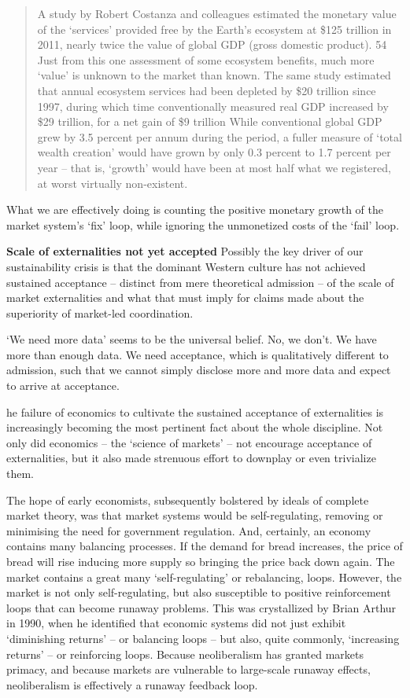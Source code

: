 \documentclass[
]{book}
\begin{document}
\begin{quote}
A study by Robert Costanza and
colleagues estimated the monetary value of the `services' provided free by the Earth's ecosystem at
\$125 trillion in 2011, nearly twice the value of global GDP (gross domestic product). 54 Just from this
one assessment of some ecosystem benefits, much more `value' is unknown to the market than
known.
The same study estimated that annual ecosystem services had been
depleted by \$20 trillion since 1997, during which time conventionally measured real GDP increased
by \$29 trillion, for a net gain of \$9 trillion
While conventional global GDP grew by 3.5 percent per
annum during the period, a fuller measure of `total wealth creation' would have grown by only 0.3
percent to 1.7 percent per year -- that is, `growth' would have been at most half what we registered, at
worst virtually non-existent.
\end{quote}

What we are effectively doing is counting the positive
monetary growth of the market system's `fix' loop, while ignoring the unmonetized costs of the `fail'
loop.

\textbf{Scale of externalities not yet accepted}
Possibly the key driver of our sustainability crisis is that the dominant Western culture has
not achieved sustained acceptance -- distinct from mere theoretical admission -- of the scale of
market externalities and what that must imply for claims made about the superiority of
market-led coordination.

`We need more data' seems to be the universal belief. No, we don't. We have more than enough data.
We need acceptance, which is qualitatively different to admission, such that we cannot simply
disclose more and more data and expect to arrive at acceptance.

he failure of economics to cultivate the sustained acceptance of externalities is increasingly
becoming the most pertinent fact about the whole discipline. Not only did economics -- the `science
of markets' -- not encourage acceptance of externalities, but it also made strenuous effort to
downplay or even trivialize them.

The hope of early economists, subsequently bolstered by ideals of complete market theory, was that
market systems would be self-regulating, removing or minimising the need for government
regulation. And, certainly, an economy contains many balancing processes. If the demand for bread
increases, the price of bread will rise inducing more supply so bringing the price back down again.
The market contains a great many `self-regulating' or rebalancing, loops.
However, the market is not only self-regulating, but also susceptible to positive reinforcement loops
that can become runaway problems. This was crystallized by Brian Arthur in 1990, when he identified
that economic systems did not just exhibit `diminishing returns' -- or balancing loops -- but also,
quite commonly, `increasing returns' -- or reinforcing loops.
Because neoliberalism has granted markets primacy, and
because markets are vulnerable to large-scale runaway effects, neoliberalism is effectively a runaway
feedback loop.
\end{document}
